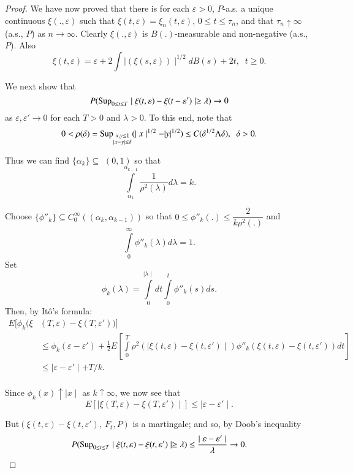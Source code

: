 \begin{proof}
We have now proved that there is for each $ \varepsilon > 0$, $P$-a.s.
a unique continuous $ \xi (., \varepsilon ) $  such that $ \xi (t,
\varepsilon ) = \xi_n ( t, \varepsilon ) $, $ 0 \leq t \leq \tau_n $,
and that $ \tau_n \uparrow \infty$ (a.s., $P$) as  $ n \rightarrow
\infty$. Clearly $ \xi (., \varepsilon ) $  is  $B (.)$-measurable
and non-negative (a.s., $P$). Also  
$$
\xi (t, \varepsilon ) = \varepsilon + 2 \int  \mid (\xi (s, \varepsilon
)) \mid^{1/2} dB (s) + 2t, \;\; t \ge 0.  
$$\pageoriginale

We next show that 
$$
P ( \operatorname{Sup}_{ 0 \leq t \leq T} \mid \xi ( t, \varepsilon)- \xi
(t-\varepsilon') \mid \ge \lambda ) \rightarrow 0  
$$   
as $ \varepsilon, \varepsilon'  \rightarrow 0 $ for each $T > 0 $ and
$ \lambda > 0 $. To this end, note that  
$$
0 < \rho ( \delta ) = \operatorname{Sup}_{\substack{ x,y \leq 1\\ \mid x-y \mid \leq 
    \delta \\}} ( \mid x \mid^{1/2} - |y|^{1/2}) \leq C (\delta^{1/2}
\Lambda \delta), \;\; \delta >0.
$$

Thus we can find  $ \{ \alpha_k \} \subseteq$ $(0, 1)$ so that   
$$
\int \limits^{\alpha_{k-1}}_{\alpha_k} \frac{1}{\rho^2 (\lambda )} d
\lambda = k . 
$$

Choose  $ \{ \phi''_k \} \subseteq C^\infty_0 (( \alpha_{k},
\alpha_{k-1} )) $ so that  $ 0 \leq \phi''_k (.) \leq
\dfrac{2}{k\rho^2 (.)} $  and  
$$
\int \limits^{\infty}_{0} \phi''_k  (\lambda) d \lambda = 1.
$$
Set 
$$
\phi_k (\lambda)= \int\limits^{\mid \lambda \mid}_{0} dt
\int\limits^{t}_{0} \phi''_{k} (s) ds.  
$$
Then, by  It\^o's formula:
{\fontsize{10pt}{12pt}\selectfont
\begin{align*}
E [ \phi_k  ( \xi & ( T, \varepsilon ) - \xi ( T, \varepsilon' )) ] \\
&\leq \phi_k ( \varepsilon - \varepsilon' ) + \frac{1}{2} E [ \int
  \limits^{T}_{0} \rho^2 ( \mid \xi (t,\varepsilon)
  -\xi(t,\varepsilon') \mid ) \phi''_k ( \xi (t,\varepsilon ) -\xi ( t,
  \varepsilon' )) dt ]\\ 
&\leq \mid \varepsilon - \varepsilon' \mid  + T/k.\\ 
\end{align*}}\relax

Since  $ \phi_k (x) \uparrow \mid x \mid $ as  $ k \uparrow \infty $, we
now see that  
$$
E [ \mid \xi ( T, \varepsilon ) - \xi ( T, \varepsilon' ) \mid  ] \leq
\mid \varepsilon - \varepsilon' \mid. 
$$

But\pageoriginale $ ( \xi (t, \varepsilon ) -\xi (t,\varepsilon'), ~
F_t, P)$ is a martingale; and so, by Doob's inequality  
$$
P ( \operatorname{Sup}_{0 \leq t \leq T } \mid \xi (t, \varepsilon ) - \xi ( t, 
\varepsilon' ) \mid  \ge \lambda ) \leq  \frac{\mid
  \varepsilon-\varepsilon' \mid}{\lambda} \rightarrow 0.  
$$


\end{proof}
